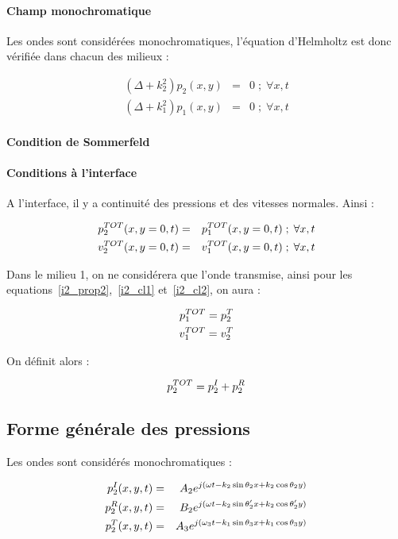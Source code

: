 \paragraph{Champ monochromatique} Les ondes sont considérées monochromatiques, l'équation d'Helmholtz est donc vérifiée
dans chacun des milieux :

\begin{eqnarray}
    (\Delta + k_2^2)p_2(x,y) & = & 0 \;;\; \forall x,t \label{i2_helm1}\\
    (\Delta + k_1^2)p_1(x,y) & = & 0 \;;\; \forall x,t \label{i2_helm2}
\end{eqnarray}

\paragraph{Condition de Sommerfeld}

\paragraph{Conditions à l'interface}

A l'interface, il y a continuité des pressions et des vitesses normales. Ainsi :

\begin{eqnarray}
    p^{TOT}_2(x, y=0, t) &=& p^{TOT}_1(x,y=0,t) \;;\;\forall x,t \label{i2_cl1}\\
    v^{TOT}_2(x, y=0, t) &=& v^{TOT}_1(x,y=0,t) \;;\;\forall x,t \label{i2_cl2}
\end{eqnarray}

Dans le milieu 1, on ne considérera que l'onde transmise, ainsi pour les equations~\eqref{i2_prop2},~\eqref{i2_cl1}
et~\eqref{i2_cl2}, on aura :

\begin{eqnarray*}
    p^{TOT}_1 = p^T_2\\
    v^{TOT}_1 = v^T_2
\end{eqnarray*}

On définit alors :

$$p^{TOT}_2 = p^I_2 + p^R_2$$

\subsection{Forme générale des pressions}

Les ondes sont considérés monochromatiques :

\begin{eqnarray}
    p^I_2(x,y,t) & = & A_2e^{j(\omega t-k_2\sin\theta_2x+k_2\cos\theta_2y)} \label{i2_pgeni}\\
    p^R_2(x,y,t) & = & B_2e^{j(\omega t-k_2\sin\theta_2'x+k_2\cos\theta_2'y)} \label{i2_pgenr}\\
    p^T_2(x,y,t) & = & A_3e^{j(\omega_3t-k_1\sin\theta_3x+k_1\cos\theta_3y)} \label{i2_pgent}
\end{eqnarray}

